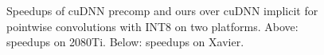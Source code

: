 \begin{figure}
\captionsetup[subfloat]{labelformat=empty,skip=0pt}

	\centering
	\vspace{-5mm}
	\vspace{-6mm}
	\caption{Speedups of cuDNN precomp and ours over cuDNN implicit for pointwise convolutions with INT8 on two platforms. Above: speedups on 2080Ti. Below: speedups on Xavier.}
	\label{fig:pwspeedupint8}
\end{figure}

%	


